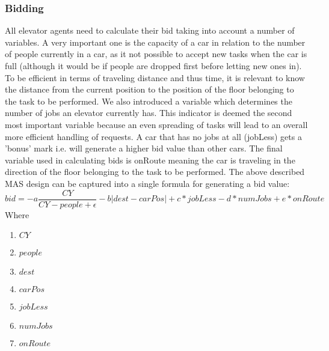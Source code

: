 \documentclass[a4paper,11pt]{article}
\begin{document}
\subsubsection{Bidding}
All elevator agents need to calculate their bid taking into account a number of variables. A very important one is the capacity of a car in relation to the number of people currently in a car, as it not possible to accept new tasks when the car is full (although it would be if people are dropped first before letting new ones in). To be efficient in terms of traveling distance and thus time, it is relevant to know the distance from the current position to the position of the floor belonging to the task to be performed. We also introduced a variable which determines the number of jobs an elevator currently has. This indicator is deemed the second most important variable because an even spreading of tasks will lead to an overall more efficient handling of requests. A car that has no jobs at all (jobLess) gets a 'bonus' mark i.e. will generate a higher bid value than other cars. The final variable used in calculating bids is onRoute meaning the car is traveling in the direction of the floor belonging to the task to be performed. 
\newline\newline
The above described MAS design can be captured into a single formula for generating a bid value:
\newline
\[bid = -a\frac{CY}{CY-people+\epsilon} - b|dest - carPos| + c*jobLess - d*numJobs + e*onRoute\]
\newline\newline
Where
\begin{enumerate}
	\item[] $CY$
	\item[] $people$
	\item[] $dest$ 
	\item[] $carPos$  
	\item[] $jobLess$ 
	\item[] $numJobs$
	\item[] $onRoute$ 
\end{enumerate}
\end{document}
